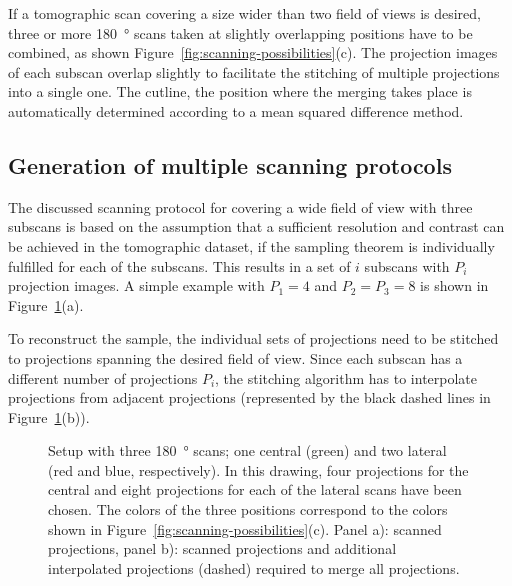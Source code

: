 If a tomographic scan covering a size wider than two field of views is desired, three or more \SI{180}{\degree} scans taken at slightly overlapping positions have to be combined, as shown Figure~\ref{fig:scanning-possibilities}(c). The projection images of each subscan overlap slightly to \cbstart facilitate the stitching of multiple projections into a single one. The cutline, \ie the position where the merging takes place is automatically determined according to a mean squared difference method.\cbend

\subsection{Generation of multiple scanning protocols}
The discussed scanning protocol for covering a wide field of view with three subscans is based on the assumption that a sufficient resolution and contrast can be achieved in the tomographic dataset, if the sampling theorem is individually fulfilled for each of the subscans. This results in a set of $i$ subscans with $P_{i}$ projection images. A simple example with $P_{1}=4$ and $P_{2}=P_{3}=8$ is shown in Figure~\ref{fig:projections}(a).

To reconstruct the sample, the individual sets of projections need to be stitched to projections spanning the desired field of view. Since each subscan has a different number of projections $P_{i}$, the stitching algorithm has to interpolate projections from adjacent projections (represented by the black dashed lines in Figure~\ref{fig:projections}(b)).\cbdelete%

\begin{figure}
	\centering
	\caption{Setup with three \SI{180}{\degree} scans; one central (green) and two lateral (red and blue, respectively). In this drawing, four projections for the central and eight projections for each of the lateral scans have been chosen. The colors of the three positions correspond to the colors shown in Figure~\ref{fig:scanning-possibilities}(c). Panel a): scanned projections, panel b): scanned projections and additional interpolated projections (dashed) required to merge all projections.}
	\ifiucr
		
	\else
	\fi
	\label{fig:projections}
\end{figure}

